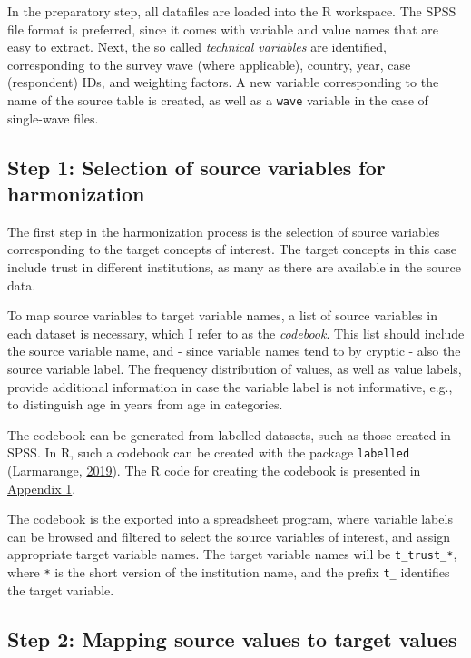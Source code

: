 \documentclass[12pt,]{article}
\begin{document}
In the preparatory step, all datafiles are loaded into the R workspace. The SPSS file format is preferred, since it comes with variable and value names that are easy to extract. Next, the so called \emph{technical variables} are identified, corresponding to the survey wave (where applicable), country, year, case (respondent) IDs, and weighting factors. A new variable corresponding to the name of the source table is created, as well as a \texttt{wave} variable in the case of single-wave files.

\hypertarget{step-1-selection-of-source-variables-for-harmonization}{%
\subsection{Step 1: Selection of source variables for harmonization}\label{step-1-selection-of-source-variables-for-harmonization}}

The first step in the harmonization process is the selection of source variables corresponding to the target concepts of interest. The target concepts in this case include trust in different institutions, as many as there are available in the source data.

To map source variables to target variable names, a list of source variables in each dataset is necessary, which I refer to as the \emph{codebook}. This list should include the source variable name, and - since variable names tend to by cryptic - also the source variable label. The frequency distribution of values, as well as value labels, provide additional information in case the variable label is not informative, e.g., to distinguish age in years from age in categories.

The codebook can be generated from labelled datasets, such as those created in SPSS. In R, such a codebook can be created with the package \texttt{labelled} (Larmarange, \protect\hyperlink{ref-labelled}{2019}). The R code for creating the codebook is presented in \protect\hyperlink{appendix1}{Appendix 1}.

The codebook is the exported into a spreadsheet program, where variable labels can be browsed and filtered to select the source variables of interest, and assign appropriate target variable names. The target variable names will be \texttt{t\_trust\_*}, where \texttt{*} is the short version of the institution name, and the prefix \texttt{t\_} identifies the target variable.

\hypertarget{step-2-mapping-source-values-to-target-values}{%
\subsection{Step 2: Mapping source values to target values}\label{step-2-mapping-source-values-to-target-values}}
\end{document}

